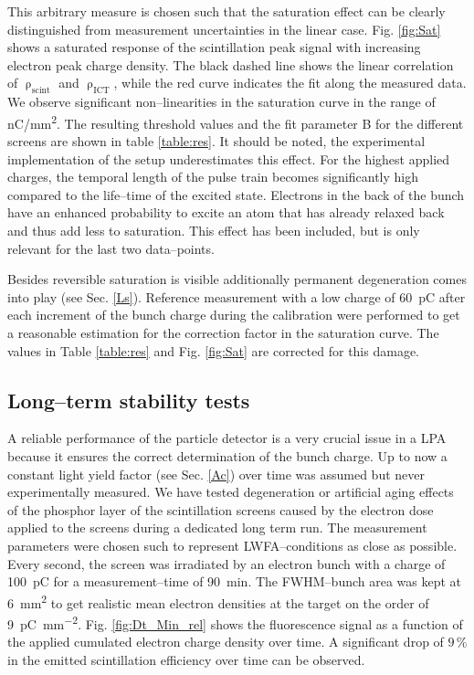 \documentclass[%
reprint,
amsmath,
amssymb,
aip,
rsi, 
numerical,
floatfix,
]{revtex4-1}
\begin{document}
This arbitrary measure is chosen such that the saturation effect can be clearly distinguished from measurement uncertainties in the linear case. 
Fig. \ref{fig:Sat} shows a saturated response of the scintillation peak signal with increasing electron peak charge density. 
The black dashed line shows the linear correlation of $\uprho_{\text{scint}}$ and $\uprho_{\text{ICT}}$, while the red curve indicates the fit along the measured data. 
We observe significant non--linearities in the saturation curve in the range of \si[per-mode=symbol]{\nano\coulomb \per \square\milli\meter}. 
The resulting threshold values and the fit parameter B for the different screens are shown in table \ref{table:res}.
It should be noted, the experimental implementation of the setup underestimates this effect. 
For the highest applied charges, the temporal length of the pulse train becomes significantly high compared to the life--time of the excited state.
Electrons in the back of the bunch have an enhanced probability to excite an atom that has already relaxed back and thus add less to saturation.
This effect has been included, but is only relevant for the last two data--points.
 
Besides reversible saturation is visible additionally permanent degeneration comes into play (see Sec. \ref{Ls}).
Reference measurement with a low charge of \SI{60}{\pico\coulomb} after each increment of the bunch charge during the calibration were performed to get a reasonable estimation for the correction factor in the saturation curve.
The values in Table \ref{table:res} and Fig. \ref{fig:Sat} are corrected for this damage.      

\subsection{\label{Ls}Long--term stability tests}
A reliable performance of the particle detector is a very crucial issue in a LPA because it ensures the correct determination of the bunch charge.
Up to now a constant light yield factor (see Sec. \ref{Ac}) over time was assumed but never experimentally measured. 
We have tested degeneration or artificial aging effects of the phosphor layer of the scintillation screens caused by the electron dose applied to the screens during a dedicated long term run.
The measurement parameters were chosen such to represent LWFA--conditions as close as possible.
Every second, the screen was irradiated by an electron bunch with a charge of \SI{100}{\pico\coulomb} for a measurement--time of \SI{90}{\minute}.
The FWHM--bunch area was kept at \SI{6}{\square\milli\meter} to get realistic mean electron densities at the target on the order of \SI[per-mode=symbol]{9}{\pico\coulomb \per \square\milli\meter}. 
Fig. \ref{fig:Dt_Min_rel} shows the fluorescence signal as a function of the applied cumulated electron charge density over time. 
A significant drop of $9\,\%$ in the emitted scintillation efficiency over time can be observed.
 
\end{document}

